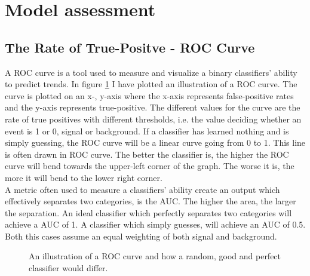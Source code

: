 \section{Model assessment}\label{subsec:Cost}
\subsection{The Rate of True-Positve - ROC Curve}\label{subsec:AUC}
A \ac{ROC} curve is a tool used to measure and visualize a binary classifiers' ability 
to predict trends. In figure \ref{fig:ROC} I have plotted an illustration of a \ac{ROC} curve.
The curve is plotted on an x-, y-axis where the x-axis represents 
false-positive rates and the y-axis represents true-positive. The different values 
for the curve are the rate of true positives with different thresholds, i.e. 
the value deciding whether an event is 1 or 0, signal or background. If a classifier 
has learned nothing and is simply guessing, the \ac{ROC} curve will be a linear curve 
going from 0 to 1. This line is often drawn in \ac{ROC} curve. The better the 
classifier is, the higher the \ac{ROC} curve will bend towards the upper-left corner of the 
graph. The worse it is, the more it will bend to the lower right corner. 
\\
A metric often used to measure a classifiers' ability create an output which effectively 
separates two categories, is the \ac{AUC}. The higher the area, the larger the separation. 
An ideal classifier which perfectly separates two categories will achieve a \ac{AUC} of 1.
A classifier which simply guesses, will achieve an \ac{AUC} of 0.5. Both this cases assume 
an equal weighting of both signal and background. 
\begin{figure}
    \centering
    \caption{An illustration of a \ac{ROC} curve and how a random, good and perfect classifier would differ.}
    \label{fig:ROC}
\end{figure}
